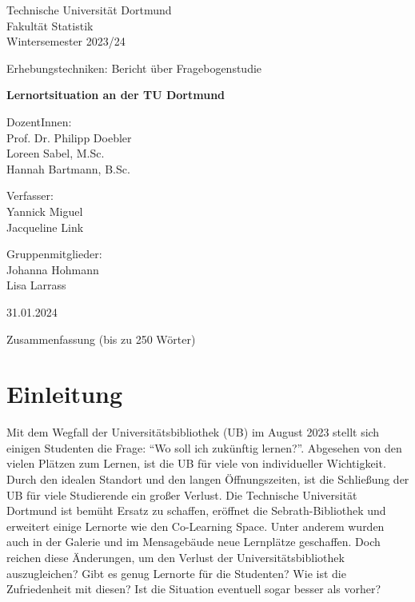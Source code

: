 \documentclass[11pt, a4paper]{article}
\begin{document}
	\thispagestyle{empty}
	
	\begin{center}
		\Large
		Technische Universität Dortmund\\
		Fakultät Statistik\\
		Wintersemester 2023/24\\
		
		\vspace{6em}
		
		Erhebungstechniken: Bericht über Fragebogenstudie
		
		\Huge
		\textbf{Lernortsituation an der TU Dortmund}
		
		\Large
		\vspace{4em}
		DozentInnen:	\\Prof. Dr. Philipp Doebler \\Loreen Sabel, M.Sc.\\Hannah Bartmann, B.Sc.
		
		
		\vspace{6em}
		Verfasser: \\
		Yannick Miguel \\Jacqueline Link
		
		\vspace{6em}
		Gruppenmitglieder:\\
		Johanna Hohmann\\
		Lisa Larrass
		
		\vspace{6em}
		
		31.01.2024
	\end{center}
	
	\newpage \null\thispagestyle{empty}\newpage
	\tableofcontents
	\newpage\null\thispagestyle{empty}\newpage
	Zusammenfassung (bis zu 250 Wörter)
	\newpage\null\thispagestyle{empty}\newpage
	
	\newpage
	\cleardoublepage%
	\section{Einleitung}
	\label{Einleitung}
	Mit dem Wegfall der Universitätsbibliothek (UB) im August 2023 stellt sich einigen Studenten die Frage: “Wo soll ich zukünftig lernen?”.
	Abgesehen von den vielen Plätzen zum Lernen, ist die UB für viele von individueller Wichtigkeit.
	Durch den idealen Standort und den langen Öffnungszeiten, ist die Schließung der UB für viele Studierende ein großer Verlust.
	Die Technische Universität Dortmund ist bemüht Ersatz zu schaffen, eröffnet die Sebrath-Bibliothek und erweitert einige Lernorte wie den Co-Learning Space.
	Unter anderem wurden auch in der Galerie und im Mensagebäude neue Lernplätze geschaffen.
	Doch reichen diese Änderungen, um den Verlust der Universitätsbibliothek auszugleichen?
	Gibt es genug Lernorte für die Studenten? Wie ist die Zufriedenheit mit diesen?
	Ist die Situation eventuell sogar besser als vorher?
	
\end{document}
